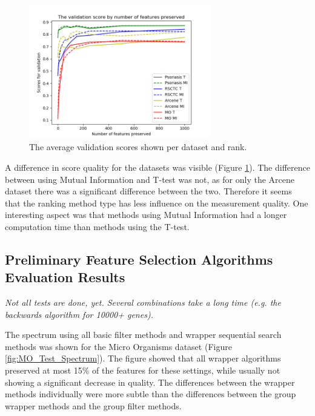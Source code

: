 \documentclass[10pt,a4paper]{article}
\begin{document}
	\begin{figure}[H]
		\includegraphics[width=0.7\textwidth]{Data_Rank_Val_Scores.png}
		\caption{The average validation scores shown per dataset and rank.}
		\label{fig:DatasetRankScores}
	\end{figure}
	
	A difference in score quality for the datasets was visible (Figure \ref{fig:DatasetRankScores}). The difference between using Mutual Information and T-test was not, as for only the Arcene dataset there was a significant difference between the two. Therefore it seems that the ranking method type has less influence on the measurement quality. One interesting aspect was that methods using Mutual Information had a longer computation time than methods using the T-test.
	
	\subsection{Preliminary Feature Selection Algorithms Evaluation Results}
	\label{subsec:FeatureSelectionAlgorithmsEvaluationResults}
	
	\textit{Not all tests are done, yet. Several combinations take a long time (e.g. the backwards algorithm for 10000+ genes).}
	
	The spectrum using all basic filter methods and wrapper sequential search methods was shown for the Micro Organisms dataset (Figure \ref{fig:MO_Test_Spectrum}). The figure showed that all wrapper algorithms preserved at most 15\% of the features for these settings, while usually not showing a significant decrease in quality. The differences between the wrapper methods individually were more subtle than the differences between the group wrapper methods and the group filter methods.
	
\end{document}
